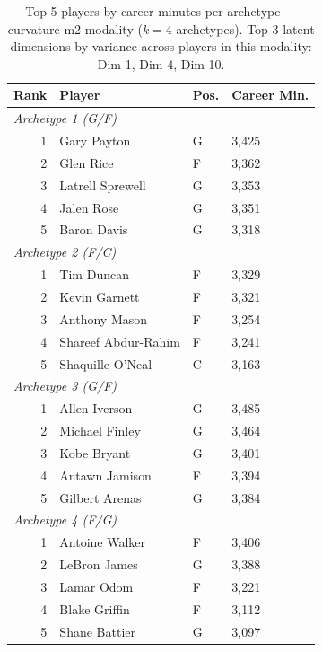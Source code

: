 \begin{table}[htbp]
  \centering\small
  \begin{tabular}{rlll}
    \toprule
    Rank & Player & Pos. & Career Min. \\
    \midrule
    \multicolumn{4}{l}{\textit{Archetype 1 (G/F)}} \\
    \midrule
    1 & Gary Payton & G & 3,425 \\
    2 & Glen Rice & F & 3,362 \\
    3 & Latrell Sprewell & G & 3,353 \\
    4 & Jalen Rose & G & 3,351 \\
    5 & Baron Davis & G & 3,318 \\
    \midrule[0.4pt]
    \multicolumn{4}{l}{\textit{Archetype 2 (F/C)}} \\
    \midrule
    1 & Tim Duncan & F & 3,329 \\
    2 & Kevin Garnett & F & 3,321 \\
    3 & Anthony Mason & F & 3,254 \\
    4 & Shareef Abdur-Rahim & F & 3,241 \\
    5 & Shaquille O'Neal & C & 3,163 \\
    \midrule[0.4pt]
    \multicolumn{4}{l}{\textit{Archetype 3 (G/F)}} \\
    \midrule
    1 & Allen Iverson & G & 3,485 \\
    2 & Michael Finley & G & 3,464 \\
    3 & Kobe Bryant & G & 3,401 \\
    4 & Antawn Jamison & F & 3,394 \\
    5 & Gilbert Arenas & G & 3,384 \\
    \midrule[0.4pt]
    \multicolumn{4}{l}{\textit{Archetype 4 (F/G)}} \\
    \midrule
    1 & Antoine Walker & F & 3,406 \\
    2 & LeBron James & G & 3,388 \\
    3 & Lamar Odom & F & 3,221 \\
    4 & Blake Griffin & F & 3,112 \\
    5 & Shane Battier & G & 3,097 \\
    \bottomrule
  \end{tabular}
  \caption{Top 5 players by career minutes per archetype --- curvature-m2 modality ($k=4$ archetypes). Top-3 latent dimensions by variance across players in this modality: Dim 1, Dim 4, Dim 10.}
  \label{tab:arch_reps_curvature_m2}
\end{table}

